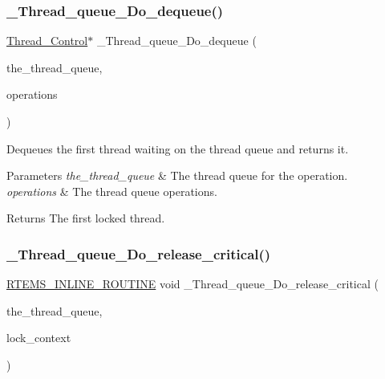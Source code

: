 \subsubsection{\texorpdfstring{\_Thread\_queue\_Do\_dequeue()}{\_Thread\_queue\_Do\_dequeue()}}
{\footnotesize\ttfamily \mbox{\hyperlink{struct__Thread__Control}{Thread\+\_\+\+Control}}$\ast$ \+\_\+\+Thread\+\_\+queue\+\_\+\+Do\+\_\+dequeue (\begin{DoxyParamCaption}\item[{\mbox{\hyperlink{structThread__queue__Control}{Thread\+\_\+queue\+\_\+\+Control}} $\ast$}]{the\+\_\+thread\+\_\+queue,  }\item[{const \mbox{\hyperlink{structThread__queue__Operations}{Thread\+\_\+queue\+\_\+\+Operations}} $\ast$}]{operations }\end{DoxyParamCaption})}



Dequeues the first thread waiting on the thread queue and returns it. 


\begin{DoxyParams}{Parameters}
{\em the\+\_\+thread\+\_\+queue} & The thread queue for the operation. \\
\hline
{\em operations} & The thread queue operations.\\
\hline
\end{DoxyParams}
\begin{DoxyReturn}{Returns}
The first locked thread. 
\end{DoxyReturn}
\mbox{\label{group__RTEMSScoreThreadQueue_ga923d39f206f389ae8a8293e22bae8fbf}} 
\subsubsection{\texorpdfstring{\_Thread\_queue\_Do\_release\_critical()}{\_Thread\_queue\_Do\_release\_critical()}}
{\footnotesize\ttfamily \mbox{\hyperlink{group__RTEMSScoreBaseDefs_gac216239df231d5dbd15e3520b0b9313f}{R\+T\+E\+M\+S\+\_\+\+I\+N\+L\+I\+N\+E\+\_\+\+R\+O\+U\+T\+I\+NE}} void \+\_\+\+Thread\+\_\+queue\+\_\+\+Do\+\_\+release\+\_\+critical (\begin{DoxyParamCaption}\item[{\mbox{\hyperlink{structThread__queue__Control}{Thread\+\_\+queue\+\_\+\+Control}} $\ast$}]{the\+\_\+thread\+\_\+queue,  }\item[{\mbox{\hyperlink{structISR__lock__Context}{I\+S\+R\+\_\+lock\+\_\+\+Context}} $\ast$}]{lock\+\_\+context }\end{DoxyParamCaption})}



